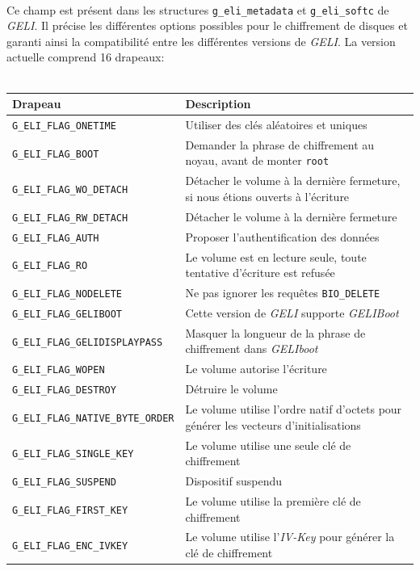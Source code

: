 \paragraph{}
Ce champ est présent dans les structures \texttt{g\_eli\_metadata} et
\texttt{g\_eli\_softc} de \textit{GELI}. Il précise les différentes options
possibles pour le chiffrement de disques et garanti ainsi la compatibilité entre
les différentes versions de \textit{GELI}. La version actuelle comprend 16
drapeaux: \\
\\
\begin{tabularx}{\linewidth}{ | l | X | }
  \hline
  \textbf{Drapeau}                           & \textbf{Description} \\
  \hline
  \texttt{G\_ELI\_FLAG\_ONETIME}             & Utiliser des clés aléatoires et
  uniques \\
  \texttt{G\_ELI\_FLAG\_BOOT}                & Demander la phrase de
  chiffrement au noyau, avant de monter \texttt{root} \\
  \texttt{G\_ELI\_FLAG\_WO\_DETACH}          & Détacher le volume à la dernière
  fermeture, si nous étions ouverts à l'écriture \\
  \texttt{G\_ELI\_FLAG\_RW\_DETACH}          & Détacher le volume à la dernière
  fermeture \\
  \texttt{G\_ELI\_FLAG\_AUTH}                & Proposer l'authentification des
  données \\
  \texttt{G\_ELI\_FLAG\_RO}                  & Le volume est en lecture seule,
  toute tentative d'écriture est refusée \\
  \texttt{G\_ELI\_FLAG\_NODELETE}            & Ne pas ignorer les requêtes
  \texttt{BIO\_DELETE} \\
  \texttt{G\_ELI\_FLAG\_GELIBOOT}            & Cette version de \textit{GELI}
  supporte \textit{GELIBoot} \\
  \texttt{G\_ELI\_FLAG\_GELIDISPLAYPASS}     & Masquer la longueur de la phrase
  de chiffrement dans \textit{GELIboot} \\
  \texttt{G\_ELI\_FLAG\_WOPEN}               & Le volume autorise l'écriture \\
  \texttt{G\_ELI\_FLAG\_DESTROY}             & Détruire le volume \\
  \texttt{G\_ELI\_FLAG\_NATIVE\_BYTE\_ORDER} & Le volume utilise l'ordre natif
  d'octets pour générer les vecteurs d'initialisations \\
  \texttt{G\_ELI\_FLAG\_SINGLE\_KEY}         & Le volume utilise une seule clé
  de chiffrement \\
  \texttt{G\_ELI\_FLAG\_SUSPEND}             & Dispositif suspendu \\
  \texttt{G\_ELI\_FLAG\_FIRST\_KEY}          & Le volume utilise la première
  clé de chiffrement \\
  \texttt{G\_ELI\_FLAG\_ENC\_IVKEY}          & Le volume utilise
  l'\textit{IV-Key} pour générer la clé de chiffrement \\
  \hline
\end{tabularx}
